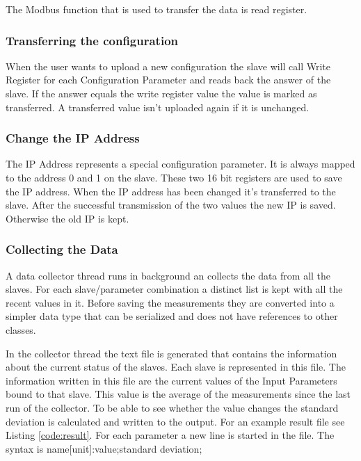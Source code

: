 The Modbus function that is used to transfer the data is read register.

\subsubsection{Transferring the configuration} %
\label{ssub:transferring_the_configuration}
When the user wants to upload a new configuration the slave will call Write Register for each Configuration Parameter and reads back the answer of the slave. If the answer equals the write register value the value is marked as transferred. A transferred value isn't uploaded again if it is unchanged.
\subsubsection{Change the IP Address} %
\label{ssub:change_the_ip_address}
The IP Address represents a special configuration parameter. It is always mapped to the address 0 and 1 on the slave. These two 16 bit registers are used to save the IP address. When the IP address has been changed it's transferred to the slave. After the successful transmission of the two values the new IP is saved. Otherwise the old IP is kept.


\subsubsection{Collecting the Data} %
\label{ssub:collecting_the_data}
A data collector thread runs in background an collects the data from all the slaves. For each slave/parameter combination a distinct list is kept with all the recent values in it. Before saving the measurements they are converted into a simpler data type that can be serialized and does not have references to other classes.

In the collector thread the text file is generated that contains the information about the current status of the slaves. Each slave is represented in this file. The information written in this file are the current values of the Input Parameters bound to that slave. This value is the average of the measurements since the last run of the collector. To be able to see whether the value changes the standard deviation is calculated and written to the output. For an example result file see Listing \ref{code:result}. 
For each parameter a new line is started in the file. The syntax is {\C name[unit]:value;standard deviation;}

